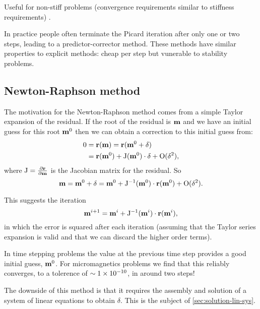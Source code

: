 Useful for non-stiff problems (convergence requirements similar to stiffness requirements) \cite{Iserles2009}.

In practice people often terminate the Picard iteration after only one or two steps, leading to a predictor-corrector method. 
These methods have similar properties to explicit methods: cheap per step but vunerable to stability problems.


\subsection{Newton-Raphson method}
\label{sec:newt-raph}

\newcommand{\resi}{\rv}
\newcommand{\jac}{\mathrm{J}}
\newcommand{\nowm}{\mv^0}
\newcommand{\nextm}{\mv}
\newcommand{\corr}{\delta}

The motivation for the Newton-Raphson method comes from a simple Taylor expansion of the residual. If the root of the residual is $\nextm$ and we have an initial guess for this root $\nowm$ then we can obtain a correction to this initial guess from:
\begin{equation}
  \begin{aligned}
    0 &= \resi(\nextm) = \resi(\nowm + \corr) \\
    &= \resi(\nowm) + \jac(\nowm) \cdot \corr + \order{\corr^2},
  \end{aligned}
\end{equation}
where $\jac = \pd{\resi}{\mv}$ is the Jacobian matrix for the residual.
So
\begin{equation}
  \label{eq:49}
  \nextm = \nowm + \corr = \nowm + \jac^{-1}(\nowm) \cdot \resi(\nowm) + \order{\corr^2}.
\end{equation}

This suggests the iteration
\begin{equation}
  \mv^{i+1} = \mv^i + \jac^{-1}(\mv^i) \cdot \resi(\mv^i),
\end{equation}
in which the error is squared after each iteration (assuming that the Taylor series expansion is valid and that we can discard the higher order terms).

In time stepping problems the value at the previous time step provides a good initial guess, $\mathbf{m}^0$.
For micromagnetics problems we find that this reliably converges, to a tolerence of $\sim1\times 10^{-10}$, in around two steps!

The downside of this method is that it requires the assembly and solution of a system of linear equations to obtain $\corr$.
This is the subject of \autoref{sec:solution-lin-sys}.


